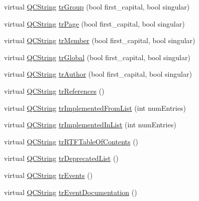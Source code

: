 \begin{DoxyCompactItemize}
\item 
virtual \mbox{\hyperlink{class_q_c_string}{Q\+C\+String}} \mbox{\hyperlink{class_translator_italian_a3d3b18c55cbaac586b581333a90023ac}{tr\+Group}} (bool first\+\_\+capital, bool singular)
\item 
virtual \mbox{\hyperlink{class_q_c_string}{Q\+C\+String}} \mbox{\hyperlink{class_translator_italian_a1301374a6a2e47a63673bb1391c54bd2}{tr\+Page}} (bool first\+\_\+capital, bool singular)
\item 
virtual \mbox{\hyperlink{class_q_c_string}{Q\+C\+String}} \mbox{\hyperlink{class_translator_italian_a6df842fcb80263a781aff7305bf71763}{tr\+Member}} (bool first\+\_\+capital, bool singular)
\item 
virtual \mbox{\hyperlink{class_q_c_string}{Q\+C\+String}} \mbox{\hyperlink{class_translator_italian_aff44c031990e38bcc000124cd4c7dd8d}{tr\+Global}} (bool first\+\_\+capital, bool singular)
\item 
virtual \mbox{\hyperlink{class_q_c_string}{Q\+C\+String}} \mbox{\hyperlink{class_translator_italian_a08817047e60ed5e627bf670e716f8379}{tr\+Author}} (bool first\+\_\+capital, bool singular)
\item 
virtual \mbox{\hyperlink{class_q_c_string}{Q\+C\+String}} \mbox{\hyperlink{class_translator_italian_ae159279b6836f25e640ee0c8f4f8146b}{tr\+References}} ()
\item 
virtual \mbox{\hyperlink{class_q_c_string}{Q\+C\+String}} \mbox{\hyperlink{class_translator_italian_a504b7730745570dd0ec3a61b3c9c5571}{tr\+Implemented\+From\+List}} (int num\+Entries)
\item 
virtual \mbox{\hyperlink{class_q_c_string}{Q\+C\+String}} \mbox{\hyperlink{class_translator_italian_a4a288c19bf1812c56fd6812dad2b178b}{tr\+Implemented\+In\+List}} (int num\+Entries)
\item 
virtual \mbox{\hyperlink{class_q_c_string}{Q\+C\+String}} \mbox{\hyperlink{class_translator_italian_a15b0cd21a8b1ed806689f0f37a77ad98}{tr\+R\+T\+F\+Table\+Of\+Contents}} ()
\item 
virtual \mbox{\hyperlink{class_q_c_string}{Q\+C\+String}} \mbox{\hyperlink{class_translator_italian_a09ebd757487d5ff33c57b0bafbba9d66}{tr\+Deprecated\+List}} ()
\item 
virtual \mbox{\hyperlink{class_q_c_string}{Q\+C\+String}} \mbox{\hyperlink{class_translator_italian_a5c52e957178fa12eff42db39fda9b1a7}{tr\+Events}} ()
\item 
virtual \mbox{\hyperlink{class_q_c_string}{Q\+C\+String}} \mbox{\hyperlink{class_translator_italian_a61585235bd1958ab76352e17e646ef21}{tr\+Event\+Documentation}} ()

\end{DoxyCompactItemize}
